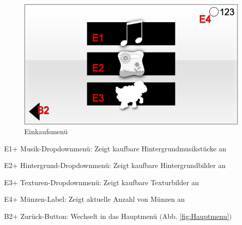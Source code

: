 \begin{figure}[H]
\centering
\includegraphics[scale=0.55]{../gui/_jpeg_numeration/shop.jpg}
\caption{Einkaufsmenü}
\label{fig:Einkaufsmenu}
\end{figure}
\begin{description*}
\item[E1+] Musik-Dropdownmenü: Zeigt kaufbare Hintergrundmusikstücke an
\item[E2+] Hintergrund-Dropdownmenü: Zeigt kaufbare Hintergrundbilder an
\item[E3+] Texturen-Dropdownmenü: Zeigt kaufbare Texturbilder an
\item[E4+] Münzen-Label: Zeigt aktuelle Anzahl von Münzen an
\item[B2+] Zurück-Button: Wechselt in das Hauptmenü $($Abb. \ref{fig:Hauptmenu}$)$
\end{description*}


